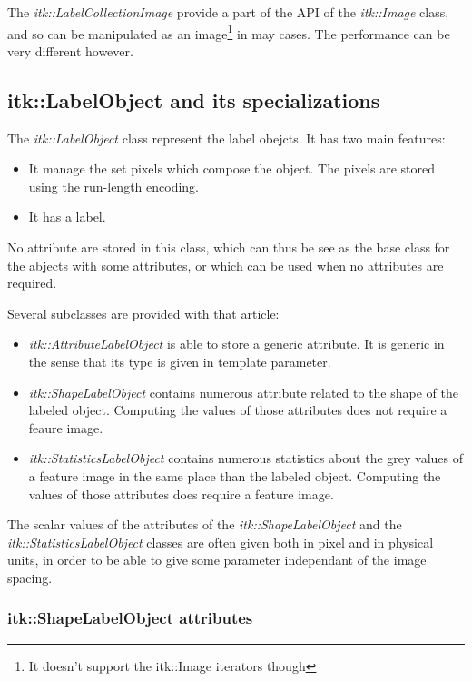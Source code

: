 \documentclass{InsightArticle}
\begin{document}
The {\em itk::LabelCollectionImage} provide a part of the API of the {\em
itk::Image} class,
and so can be manipulated as an image\footnote{It doesn't support the itk::Image
iterators though}
in may cases. The performance can be very different however.

\subsection{itk::LabelObject and its specializations}

The {\em itk::LabelObject} class represent the label obejcts. It has two main
features:
\begin{itemize}
  \item It manage the set pixels which compose the object. The pixels are stored
using the run-length encoding.
  \item It has a label.
\end{itemize}

No attribute are stored in this class, which can thus be see as the base class
for the abjects with some attributes, or which can be used when no attributes
are required.

Several subclasses are provided with that article:
\begin{itemize}
  \item {\em itk::AttributeLabelObject} is able to store a generic attribute. It
is generic in the sense that its type is given in template parameter.
  \item {\em itk::ShapeLabelObject} contains numerous attribute related to the
shape of the labeled object. Computing the values of those attributes does not
require a feaure image.
  \item {\em itk::StatisticsLabelObject} contains numerous statistics about the
grey values of a feature image in the same place than the labeled object.
Computing the values of those attributes does require a feature image.
\end{itemize}

The scalar values of the attributes of the {\em itk::ShapeLabelObject} and the
{\em itk::StatisticsLabelObject} classes are often given both in pixel and in physical units,
in order to be able to give some parameter independant of the image spacing.

\subsubsection{itk::ShapeLabelObject attributes}
\end{document}
